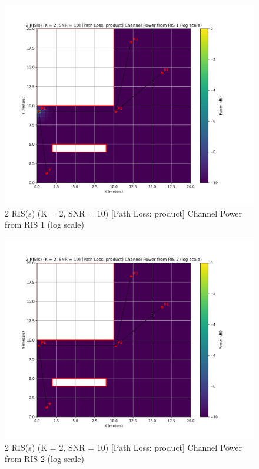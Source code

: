 \begin{figure}[H]
  \centering
  \includegraphics[width=0.8\linewidth]{imgs/heatmap-simulations/2 RIS(s) (K = 2, SNR = 10) [Path Loss_ product] Channel Power from RIS 1 (log scale).png}
  \caption{2 RIS(s) (K = 2, SNR = 10) [Path Loss: product] Channel Power from RIS 1 (log scale)}
\end{figure}

\begin{figure}[H]
  \centering
  \includegraphics[width=0.8\linewidth]{imgs/heatmap-simulations/2 RIS(s) (K = 2, SNR = 10) [Path Loss_ product] Channel Power from RIS 2 (log scale).png}
  \caption{2 RIS(s) (K = 2, SNR = 10) [Path Loss: product] Channel Power from RIS 2 (log scale)}
\end{figure}

